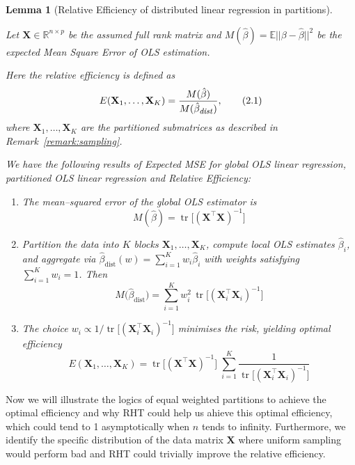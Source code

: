 \documentclass[11pt]{article}
\numberwithin{equation}{section}
\theoremstyle{plain}
\newtheorem{lemma}[theorem]{Lemma}
\theoremstyle{definition}
\theoremstyle{remark}
\begin{document}
\begin{lemma}[Relative Efficiency of distributed linear regression in partitions]
  \label{lem:finiteresults}

    Let \(\mathbf{X}\in\mathbb{R}^{n\times p}\) be the assumed full rank matrix and $M(\hat{\beta}) = \mathbb{E}||\beta - \hat{\beta}||^2$ be the expected Mean Square Error of OLS estimation.
    
    Here the relative efficiency is defined as
    \[
    E(\mathbf{X}_1,\dots,\mathbf{X}_K) = \frac{M(\hat{\beta})}{M(\hat{\beta}_{\text{\footnotesize \textit{dist}}})},\tag{2.1} \label{eq:2.1}
    \]
    where \({\mathbf{X}}_{1}, \ldots, {\mathbf{X}}_{K}\) are the partitioned submatrices as described in Remark~\ref{remark:sampling}.

    We have the following results of Expected MSE for global OLS linear regression, partitioned OLS linear regression and Relative Efficiency:
    \begin{enumerate}
    \item The mean–squared error of the global OLS estimator is
          \[
            M(\hat\beta)=\operatorname{tr}\!\bigl[(\mathbf{X}^{\top}\mathbf{X})^{-1}\bigr]\tag{2.2} \label{eq:2.2}
          \]
    \item Partition the data into \(K\) blocks \(\mathbf{X}_1,\dots,\mathbf{X}_K\),
          compute local OLS estimates \(\hat\beta_{i}\), and aggregate via
          \(\hat\beta_{\mathrm{dist}}(w)=\sum_{i=1}^{K}w_{i}\hat\beta_{i}\)
          with weights satisfying \(\sum_{i=1}^{K}w_{i}=1\).
          Then
          \[
            M\!\bigl(\hat\beta_{\mathrm{dist}}\bigr)=
            \sum_{i=1}^{K}w_{i}^{2}\,
            \operatorname{tr}\!\bigl[(\mathbf{X}_{i}^{\top}\mathbf{X}_{i})^{-1}\bigr]\tag{2.3} \label{eq:2.3}
          \]
    \item The choice
          \(w_{i}\propto 1/\operatorname{tr}\!\bigl[(\mathbf{X}_{i}^{\top}\mathbf{X}_{i})^{-1}\bigr]\)
          minimises the risk, yielding optimal efficiency
          \[
            E(\mathbf{X}_{1},\dots,\mathbf{X}_{K})=
            \operatorname{tr}\!\bigl[(\mathbf{X}^{\top}\mathbf{X})^{-1}\bigr]\;
            \sum_{i=1}^{K}
            \frac{1}{\operatorname{tr}\!\bigl[(\mathbf{X}_{i}^{\top}\mathbf{X}_{i})^{-1}\bigr]}\tag{2.4} \label{eq:2.4}
          \]
    \end{enumerate}
    \end{lemma}
\vspace{0.39cm}
Now we will illustrate the logics of equal weighted partitions to achieve the optimal efficiency and why RHT could help us ahieve this optimal efficiency, which could tend to 1 asymptotically when $n$ tends to infinity. Furthermore, we identify the specific distribution of the data matrix $\mathbf{X}$ where uniform sampling would perform bad and RHT could trivially improve the relative efficiency.
\end{document}
